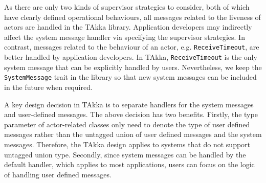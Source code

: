 As there are only two kinds of supervisor strategies to
consider, both of which have clearly defined operational behaviours, all
messages related to the liveness of actors are handled in the TAkka library. 
Application developers may indirectly affect the system message handler via 
specifying
the supervisor strategies. In contrast, messages related to the behaviour of an
actor, e.g. {\tt ReceiveTimeout}, are better handled by application
developers. In TAkka, {\tt ReceiveTimeout} is the only system message that can
be explicitly handled by users.  Nevertheless, we keep the {\tt SystemMessage}
trait in the library so that new system messages can be included in the future
when required.

A key design decision in TAkka is to separate handlers for the system messages 
and user-defined messages.  The above decision has two benefits. Firstly,
the type parameter of actor-related classes only need to denote
the type of user defined messages rather than the untagged union of user 
defined messages and the system messages.  Therefore, the TAkka design applies
to systems that do not support untagged union type.  Secondly, since 
system messages can be handled by the default handler, which applies
to most applications, users can focus on the logic of handling user
defined messages.

